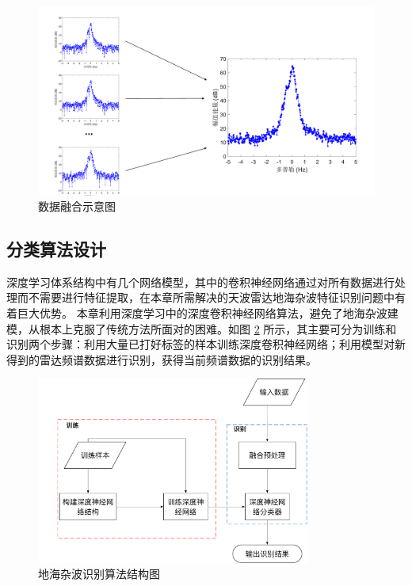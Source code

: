 \begin{figure}[hbt]
	\centering
	\includegraphics[width=13.5cm]{figures/othr/spectrum_fusion}
	\caption{数据融合示意图}
	\label{fig:spectrum_fusion}
\end{figure}

\subsection{分类算法设计}
深度学习体系结构中有几个网络模型，其中的卷积神经网络通过对所有数据进行处理而不需要进行特征提取，在本章所需解决的天波雷达地海杂波特征识别问题中有着巨大优势。
本章利用深度学习中的深度卷积神经网络算法，避免了地海杂波建模，从根本上克服了传统方法所面对的困难。如图 \ref{fig:othr_tech} 所示，其主要可分为训练和识别两个步骤：利用大量已打好标签的样本训练深度卷积神经网络；利用模型对新得到的雷达频谱数据进行识别，获得当前频谱数据的识别结果。

\begin{figure}[hbt]
	\centering
	\includegraphics[width=9cm]{figures/othr/othr_tech}
	\caption{地海杂波识别算法结构图}
	\label{fig:othr_tech}
\end{figure}

